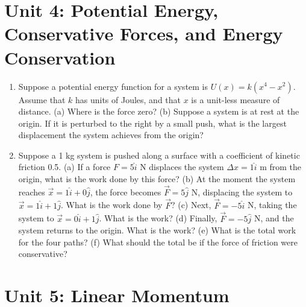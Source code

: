 \documentclass[10pt]{article}
\begin{document}
\twocolumn

\maketitle

\section{Unit 4: Potential Energy, Conservative Forces, and Energy Conservation}

\begin{enumerate}
\item  Suppose a potential energy function for a system is $U(x) = k(x^4-x^2)$. Assume that $k$ has units of Joules, and that $x$ is a unit-less measure of distance. 
 (a)  Where is the force zero? (b) Suppose a system is at rest at the origin.  If it is perturbed to the right by a small push, what is the largest displacement the system achieves from the origin? \\ \vspace{3.0cm}
 \item Suppose a 1 kg system is pushed along a surface with a coefficient of kinetic friction 0.5.  (a) If a force $F = 5\hat{i}$ N displaces the system $\Delta x = 1\hat{i}$ m from the origin, what is the work done by this force? (b) At the moment the system reaches $\vec{x} = 1\hat{i} + 0\hat{j}$, the force becomes $\vec{F} = 5\hat{j}$ N, displacing the system to $\vec{x} = 1\hat{i} + 1\hat{j}$.  What is the work done by $\vec{F}$?  (c) Next, $\vec{F} = -5 \hat{i}$ N, taking the system to $\vec{x} = 0\hat{i} + 1\hat{j}$.  What is the work? (d) Finally, $\vec{F} = -5 \hat{j}$ N, and the system returns to the origin.  What is the work?  (e) What is the total work for the four paths?  (f) What should the total be if the force of friction were conservative? \\ \vspace{4cm}
\end{enumerate}

\section{Unit 5: Linear Momentum}
\end{document}

